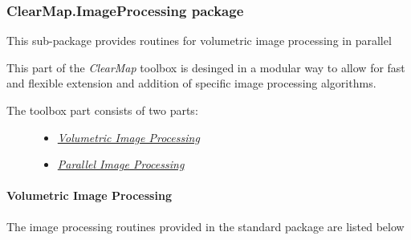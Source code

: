 \documentclass[letterpaper,10pt,english]{sphinxmanual}
\begin{document}
\subsubsection{ClearMap.ImageProcessing package}
\label{api/ClearMap.ImageProcessing:clearmap-imageprocessing-package}\label{api/ClearMap.ImageProcessing::doc}\label{api/ClearMap.ImageProcessing:module-ClearMap.ImageProcessing}
This sub-package provides routines for volumetric image processing in parallel

This part of the \emph{ClearMap} toolbox is desinged in a modular way to allow for
fast and flexible extension and addition of specific image processing
algorithms.
\begin{description}
\item[{The toolbox part consists of two parts:}] \leavevmode\begin{itemize}
\item {} 
{\hyperref[api/ClearMap.ImageProcessing:volumetric-image-processing]{\emph{Volumetric Image Processing}}}

\item {} 
{\hyperref[api/ClearMap.ImageProcessing:parallel-image-processing]{\emph{Parallel Image Processing}}}

\end{itemize}

\end{description}


\paragraph{Volumetric Image Processing}
\label{api/ClearMap.ImageProcessing:volumetric-image-processing}
The image processing routines provided in the standard package are listed below
\end{document}
